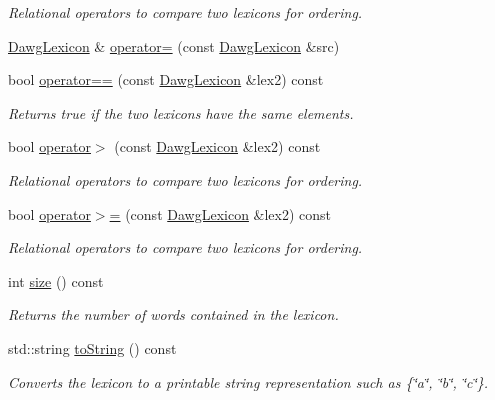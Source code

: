 \begin{DoxyCompactItemize}
\begin{DoxyCompactList}\small\item\em Relational operators to compare two lexicons for ordering. \end{DoxyCompactList}\item 
\mbox{\hyperlink{classDawgLexicon}{Dawg\+Lexicon}} \& \mbox{\hyperlink{classDawgLexicon_a49b7a2bbf9b046065610b18f6ee07889}{operator=}} (const \mbox{\hyperlink{classDawgLexicon}{Dawg\+Lexicon}} \&src)
\item 
bool \mbox{\hyperlink{classDawgLexicon_a3703f712d34b03fe8ea4f7037ed1cb26}{operator==}} (const \mbox{\hyperlink{classDawgLexicon}{Dawg\+Lexicon}} \&lex2) const
\begin{DoxyCompactList}\small\item\em Returns true if the two lexicons have the same elements. \end{DoxyCompactList}\item 
bool \mbox{\hyperlink{classDawgLexicon_ad36b61790c0aa454fddf60d15b52b158}{operator$>$}} (const \mbox{\hyperlink{classDawgLexicon}{Dawg\+Lexicon}} \&lex2) const
\begin{DoxyCompactList}\small\item\em Relational operators to compare two lexicons for ordering. \end{DoxyCompactList}\item 
bool \mbox{\hyperlink{classDawgLexicon_af4f0508490235ae1af1b9234ac9fe01d}{operator$>$=}} (const \mbox{\hyperlink{classDawgLexicon}{Dawg\+Lexicon}} \&lex2) const
\begin{DoxyCompactList}\small\item\em Relational operators to compare two lexicons for ordering. \end{DoxyCompactList}\item 
int \mbox{\hyperlink{classDawgLexicon_af9593d4a5ff4274efaf429cb4f9e57cc}{size}} () const
\begin{DoxyCompactList}\small\item\em Returns the number of words contained in the lexicon. \end{DoxyCompactList}\item 
std\+::string \mbox{\hyperlink{classDawgLexicon_a1fe5121d6528fdea3f243321b3fa3a49}{to\+String}} () const
\begin{DoxyCompactList}\small\item\em Converts the lexicon to a printable string representation such as \{\char`\"{}a\char`\"{}, \char`\"{}b\char`\"{}, \char`\"{}c\char`\"{}\}. \end{DoxyCompactList}\end{DoxyCompactItemize}



